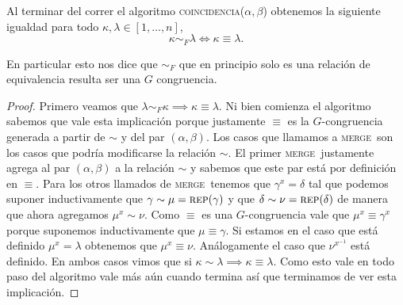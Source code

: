 \documentclass[tesis.tex]{subfiles}
\newcommand{\rep}{\textsc{rep}}
\newcommand{\coin}{\textsc{coincidencia}}
\newcommand{\mer}{\textsc{merge}}
\begin{document}
\begin{teo}
    Al terminar del correr el algoritmo \coin($\alpha, \beta$) obtenemos la siguiente igualdad para todo $\kappa, \lambda \in [1,\dots,n]$,
    \begin{equation*}
    	\kappa \sim_F \lambda \iff \kappa \equiv \lambda.
    \end{equation*}
\end{teo}

\begin{obs}
	En particular esto nos dice que $\sim_F$ que en principio solo es una relación  de equivalencia resulta ser una $G$ congruencia.
\end{obs}

\begin{proof}
     Primero veamos que $\lambda \sim_F \kappa \implies \kappa \equiv \lambda$.
     Ni bien comienza el algoritmo sabemos que vale esta implicación porque justamente $\equiv$ es la $G$-congruencia generada a partir de $\sim$ y del par $(\alpha, \beta)$.
     Los casos que llamamos a \mer \ son los casos que podría modificarse la relación $\sim$.
     El primer \mer \ justamente agrega al par $(\alpha, \beta)$ a la relación $\sim$ y sabemos que este par está por definición en $\equiv$. 
     Para los otros llamados de \mer \ tenemos que $\gamma^x = \delta$ tal que podemos suponer inductivamente que $\gamma \sim \mu = \rep(\gamma)$ y que $\delta \sim \nu = \rep (\delta)$ de manera que ahora agregamos $\mu^x \sim \nu$.
     Como $\equiv$ es una $G$-congruencia vale que $\mu^x \equiv \gamma^x$ porque suponemos inductivamente que $\mu \equiv \gamma$.
     Si estamos en el caso que está definido $\mu^x=\lambda$  obtenemos que $\mu^x \equiv \nu$. 
     Análogamente el caso que $\nu^{x^{-1}}$ está definido. 
     En ambos casos vimos que si $\kappa \sim \lambda \implies \kappa \equiv \lambda$. 
     Como esto vale en todo paso del algoritmo vale más aún cuando termina así que terminamos de ver esta implicación.


\end{proof}
\end{document}
